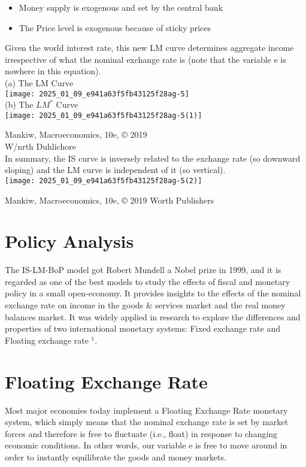 \documentclass[10pt]{article}
\begin{document}
\begin{itemize}
  \item Money supply is exogenous and set by the central bank
  \item The Price level is exogenous because of sticky prices
\end{itemize}

Given the world interest rate, this new LM curve determines aggregate income irrespective of what the nominal exchange rate is (note that the variable e is nowhere in this equation).\\
(a) The LM Curve\\
\texttt{[image: 2025\_01\_09\_e941a63f5fb43125f28ag-5]}\\
(b) The $L M^{*}$ Curve\\
\texttt{[image: 2025\_01\_09\_e941a63f5fb43125f28ag-5(1)]}

Mankiw, Macroeconomics, 10e, © 2019\\
W/nrth Duhlichore\\
In summary, the IS curve is inversely related to the exchange rate (so downward sloping) and the LM curve is independent of it (so vertical).\\
\texttt{[image: 2025\_01\_09\_e941a63f5fb43125f28ag-5(2)]}

Mankiw, Macroeconomics, 10e, © 2019 Worth Publishers

\section*{Policy Analysis}
The IS-LM-BoP model got Robert Mundell a Nobel prize in 1999, and it is regarded as one of the best models to study the effects of fiscal and monetary policy in a small open-economy. It provides insights to the effects of the nominal exchange rate on income in the goods \& services market and the real money balances market. It was widely applied in research to explore the differences and properties of two international monetary systems: Fixed exchange rate and Floating exchange rate ${ }^{1}$.

\section*{Floating Exchange Rate}
Most major economies today implement a Floating Exchange Rate monetary system, which simply means that the nominal exchange rate is set by market forces and therefore is free to fluctuate (i.e., float) in response to changing economic conditions. In other words, our variable e is free to move around in order to instantly equilibrate the goods and money markets.
\end{document}
